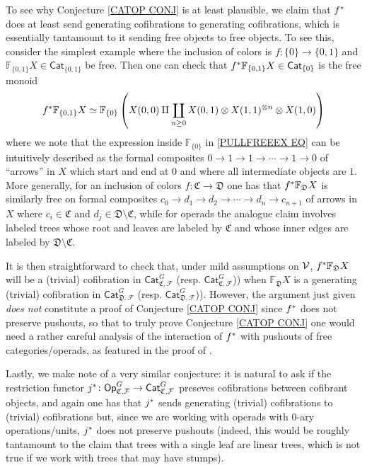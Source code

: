 \documentclass[a4paper,10pt
,draft
]{article}%
\renewcommand{\F}{\mathcal F}
\renewcommand{\1}{\eta}%
\begin{document}
\begin{remark}
To see why Conjecture \ref{CATOP CONJ} is at least plausible,
we claim that $f^{\**}$ does at least send generating cofibrations to generating cofibrations, 
which is essentially tantamount to it sending free objects to free objects.
To see this, consider the simplest example 
where the inclusion of colors is 
$f \colon \{0\} \to \{0,1\}$
and $\mathbb{F}_{\{0,1\}}X \in \mathsf{Cat}_{\{0,1\}}$ be free.
Then one can check that $f^{\**} \mathbb{F}_{\{0,1\}}X \in \mathsf{Cat}_{\{0\}}$ is the free monoid
\begin{equation}\label{PULLFREEEX EQ}
	f^{\**} \mathbb{F}_{\{0,1\}}X
\simeq
	\mathbb{F}_{\{0\}}
	\left(X(0,0) \amalg 
	\coprod_{n \geq 0}
	X(0,1)\otimes X(1,1)^{\otimes n} \otimes X(1,0) 
	\right)
\end{equation}
where we note that the expression inside
$\mathbb{F}_{\{0\}}$
in \eqref{PULLFREEEX EQ}
can be intuitively described as the formal composites
$0 \to 1 \to 1 \to \cdots \to 1 \to 0$
of ``arrows'' in $X$ which start and end at $0$ and where all intermediate objects are $1$.
More generally, for an inclusion of colors 
$f \colon \mathfrak{C} \to \mathfrak{D}$
one has that $f^{\**} \mathbb{F}_{\mathfrak{D}} X$
is similarly free on formal composites
$c_0 \to d_1 \to d_2 \to \cdots \to d_n \to c_{n+1}$
of arrows in $X$
where $c_i \in \mathfrak{C}$
and $d_j \in \mathfrak{D} \setminus \mathfrak{C}$,
while for operads the analogue claim involves labeled trees whose root and leaves are labeled by $\mathfrak{C}$
and whose inner edges are labeled by 
$\mathfrak{D} \setminus \mathfrak{C}$.
 
It is then straightforward to check that, under mild assumptions on $\mathcal V$,
$f^{\**} \mathbb{F}_{\mathfrak{D}} X$
will be a (trivial) cofibration in 
$\mathsf{Cat}^G_{\mathfrak{C},\F}$
(resp. $\mathsf{Cat}^G_{\mathfrak{C},\F}$))
when $\mathbb{F}_{\mathfrak{D}} X$
is a generating (trivial) cofibration
in $\mathsf{Cat}^G_{\mathfrak{D},\F}$
(resp. $\mathsf{Cat}^G_{\mathfrak{D},\F}$)).
However, the argument just given \emph{does not} constitute a proof of Conjecture \ref{CATOP CONJ}
since $f^{\**}$ does not preserve pushouts, 
so that to truly prove Conjecture \ref{CATOP CONJ}
one would need a rather careful analysis of the interaction of $f^{\**}$ with pushouts of free categories/operads, 
as featured in the proof of \cite[Thm. 1.15]{BM13}.

Lastly, we make note of a very similar conjecture:
it is natural to ask if the restriction functor
$j^{\**} \colon \mathsf{Op}_{\mathfrak{C},\F}^G 
\to \mathsf{Cat}_{\mathfrak{C},\F}^G$
preseves cofibrations between cofibrant objects,
and again one has that $j^{\**}$ 
sends generating (trivial) cofibrations to (trivial) cofibrations but,
since we are working with operads with $0$-ary operations/units,
$j^{\**}$ does not preserve pushouts
(indeed, this would be roughly tantamount to the claim that trees with a single leaf are linear trees, which is not true if we work with trees that may have stumps).
\end{remark}
\end{document}
